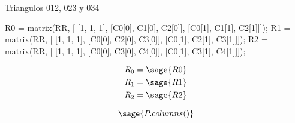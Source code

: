 \documentclass{amsart}
\begin{document}
Triangulos 012, 023 y 034

\begin{sageblock}
R0 = matrix(RR,  [
[1, 	1, 		1],
[C0[0], C1[0], 	C2[0]],
[C0[1], C1[1], 	C2[1]]]);
R1 = matrix(RR,  [
[1, 	1, 		1],
[C0[0], C2[0], 	C3[0]],
[C0[1], C2[1], 	C3[1]]]);
R2 = matrix(RR,  [
[1, 	1, 		1],
[C0[0], C3[0], 	C4[0]],
[C0[1], C3[1], 	C4[1]]]);
\end{sageblock}

\begin{align*}
	R_0 &= \sage{R0} \\
	R_1 &= \sage{R1} \\
	R_2 &= \sage{R2} \\
\end{align*}

$$
	\sage{P.columns()}
$$

\end{document}
